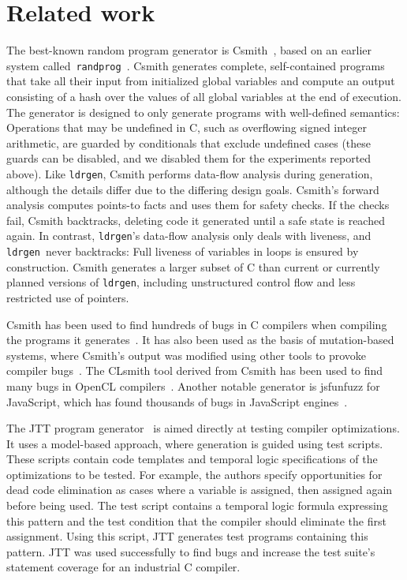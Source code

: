 \documentclass{llncs}
\newcommand\ldrgen{\texttt{ldrgen}}
\begin{document}
\section{Related work}

The best-known random program generator is Csmith~\cite{csmith-2011}, based
on an earlier system
called~\texttt{randprog}~\cite{eide.regehr-2008,randprog-2007}. Csmith
generates complete, self-contained programs that take all their input from
initialized global variables and compute an output consisting of a hash over
the values of all global variables at the end of execution. The generator is
designed to only generate programs with well-defined semantics: Operations
that may be undefined in C, such as overflowing signed integer arithmetic,
are guarded by conditionals that exclude undefined cases (these guards can
be disabled, and we disabled them for the experiments reported above). Like
\ldrgen, Csmith performs data-flow analysis during generation, although the
details differ due to the differing design goals. Csmith's forward analysis
computes points-to facts and uses them for safety checks. If the checks
fail, Csmith backtracks, deleting code it generated until a safe state is
reached again. In contrast, \ldrgen's data-flow analysis only deals with
liveness, and \ldrgen\ never backtracks: Full liveness of variables in loops
is ensured by construction. Csmith generates a larger subset of C than
current or currently planned versions of \ldrgen, including unstructured
control flow and less restricted use of pointers.

Csmith has been used to find hundreds of bugs in C compilers when compiling
the programs it generates~\cite{csmith-2011}. It has also been used as the
basis of mutation-based systems, where Csmith's output was modified using
other tools to provoke compiler bugs~\cite{le.etal-2014}. The CLsmith tool
derived from Csmith has been used to find many bugs in OpenCL
compilers~\cite{lidbury.etal-2015}. Another notable generator is jsfunfuzz
for JavaScript, which has found thousands of bugs in JavaScript
engines~\cite{jsfunfuzz}.


The JTT program generator~\cite{zhao.etal-2009} is aimed directly at testing
compiler optimizations. It uses a model-based approach, where generation is
guided using test scripts. These scripts contain code templates and temporal
logic specifications of the optimizations to be tested. For example, the
authors specify opportunities for dead code elimination as cases where a
variable is assigned, then assigned again before being used. The test script
contains a temporal logic formula expressing this pattern and the test
condition that the compiler should eliminate the first assignment. Using
this script, JTT generates test programs containing this pattern. JTT was
used successfully to find bugs and increase the test suite's statement
coverage for an industrial C compiler.
\end{document}
